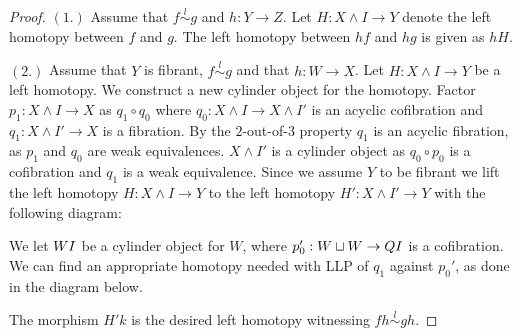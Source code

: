 \documentclass[../thesis.tex]{subfiles}
\begin{document}
            \begin{proof}
                $(1.)$ Assume that $f \overset{l}{\sim} g$ and $h:Y\rightarrow Z$. Let $H:X\wedge I \rightarrow Y$ denote the left homotopy between $f$ and $g$. The left homotopy between $hf$ and $hg$ is given as $hH$.

                $(2.)$ Assume that $Y$ is fibrant, $f \overset{l}{\sim} g$ and that $h:W\rightarrow X$. Let $H:X\wedge I\rightarrow Y$ be a left homotopy. We construct a new cylinder object for the homotopy. Factor $p_1:X\wedge I \rightarrow X$ as $q_1\circ q_0$ where $q_0: X\wedge I \rightarrow X\wedge I'$ is an acyclic cofibration and $q_1:X\wedge I'\rightarrow X$ is a fibration. By the $2$-out-of-$3$ property $q_1$ is an acyclic fibration, as $p_1$ and $q_0$ are weak equivalences. $X\wedge I'$ is a cylinder object as $q_0\circ p_0$ is a cofibration and $q_1$ is a weak equivalence. Since we assume $Y$ to be fibrant we lift the left homotopy $H:X\wedge I\rightarrow Y$ to the left homotopy $H':X\wedge I'\rightarrow Y$ with the following diagram:
                \begin{center}
                \end{center}
                We let $W \smash I$ be a cylinder object for $W$, where $p_0' : W \sqcup W \rightarrow Q \smash I$ is a cofibration. We can find an appropriate homotopy needed with LLP of $q_1$ against $p_0'$, as done in the diagram below.
                \begin{center}
                \end{center}
                The morphism $H'k$ is the desired left homotopy witnessing $fh \overset{l}{\sim} gh$.


\end{proof}
\end{document}
